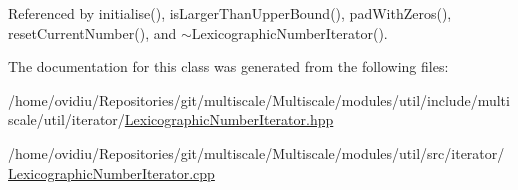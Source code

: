 Referenced by initialise(), is\-Larger\-Than\-Upper\-Bound(), pad\-With\-Zeros(), reset\-Current\-Number(), and $\sim$\-Lexicographic\-Number\-Iterator().



The documentation for this class was generated from the following files\-:\begin{DoxyCompactItemize}
\item 
/home/ovidiu/\-Repositories/git/multiscale/\-Multiscale/modules/util/include/multiscale/util/iterator/\hyperlink{LexicographicNumberIterator_8hpp}{Lexicographic\-Number\-Iterator.\-hpp}\item 
/home/ovidiu/\-Repositories/git/multiscale/\-Multiscale/modules/util/src/iterator/\hyperlink{LexicographicNumberIterator_8cpp}{Lexicographic\-Number\-Iterator.\-cpp}\end{DoxyCompactItemize}

